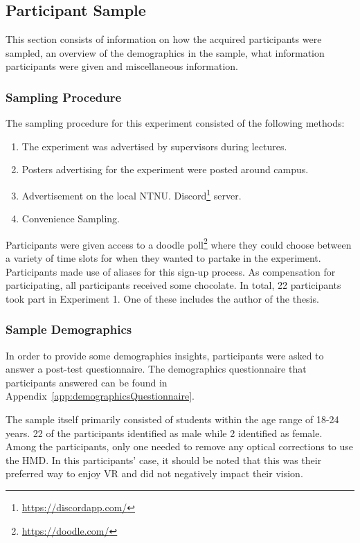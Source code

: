 \subsection{Participant Sample}
This section consists of information on how the acquired participants were sampled, an overview of the demographics in the sample, what information participants were given and miscellaneous information. 

\subsubsection{Sampling Procedure}
The sampling procedure for this experiment consisted of the following methods:

\begin{enumerate}
    \item The experiment was advertised by supervisors during lectures.
    \item Posters advertising for the experiment were posted around campus.
    \item Advertisement on the local NTNU. Discord\footnote{\url{https://discordapp.com/}} server.
    \item Convenience Sampling.
\end{enumerate}

Participants were given access to a doodle poll\footnote{\url{https://doodle.com/}} where they could choose between a variety of time slots for when they wanted to partake in the experiment. Participants made use of aliases for this sign-up process. As compensation for participating, all participants received some chocolate. In total, 22 participants took part in Experiment 1. One of these includes the author of the thesis. 

\subsubsection{Sample Demographics}
In order to provide some demographics insights, participants were asked to answer a post-test questionnaire. The demographics questionnaire that participants answered can be found in Appendix~\ref{app:demographicsQuestionnaire}.

The sample itself primarily consisted of students within the age range of 18-24 years. 22 of the participants identified as male while 2 identified as female. Among the participants, only one needed to remove any optical corrections to use the HMD. In this participants' case, it should be noted that this was their preferred way to enjoy VR and did not negatively impact their vision. 

